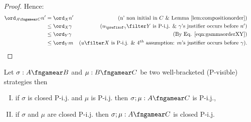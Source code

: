 \begin{proof}
Hence:
\begin{align*}
\ord_{A\fngamear C} n' 
& = \ord_{X} n' & \mbox{(n' non initial in $C$ \& Lemma \ref{lem:compositionorder})} \\
& \leq \ord_{X} \gamma & \mbox{($u_{\prefixof \gamma}\filter Y$ is P-i.j. \& $\gamma$'s justifier occurs before $n'$)} \\
& \leq \ord_{Y} \gamma & \mbox{(By Eq. \ref{eqn:gammaorderXY})} \\
& \leq \ord_{Y} m & \mbox{($u\filter X$ is P-i.j. \& 
4$^{th}$ assumption: $m$'s justifier occurs before $\gamma$)}. 
\end{align*}
\end{proof}


\begin{proposition}
\label{prop:pijcompose_when_orda_geq_ordb}
Let $\sigma : A \fngamear B$ and $\mu : B \fngamear C$
be two well-bracketed (P-visible) strategies then
\begin{enumerate}[(I)]
\item if $\sigma$ is closed P-i.j. and $\mu$ is P-i.j.
then $\sigma ; \mu : A \fngamear C$ is P-i.j.,
\item if $\sigma$ and $\mu$ are closed P-i.j.
then $\sigma ; \mu : A \fngamear C$ is closed P-i.j.
\end{enumerate}
\end{proposition}

